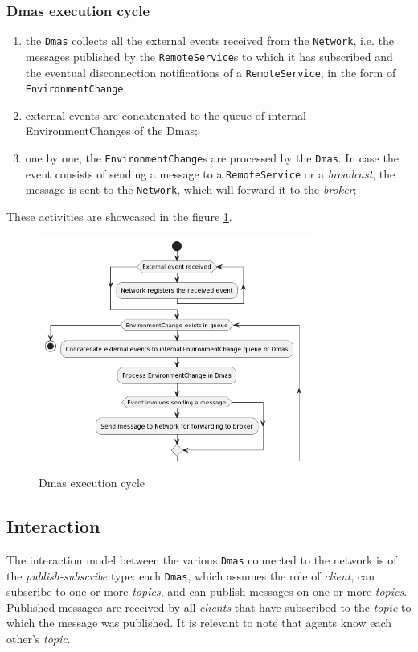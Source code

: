 \subsubsection{Dmas execution cycle}

\begin{enumerate}
    \item the \texttt{Dmas} collects all the external events received from the \texttt{Network},
          i.e. the messages published by the \texttt{RemoteService}s to which it has subscribed and the eventual disconnection notifications of a \texttt{RemoteService},
          in the form of \texttt{EnvironmentChange};
    \item external events are concatenated to the queue of internal EnvironmentChanges of the Dmas;
    \item one by one, the \texttt{EnvironmentChange}s are processed by the \texttt{Dmas}. In case the event consists of sending a message to a \texttt{RemoteService} or a \textit{broadcast}, the message is sent to the \texttt{Network}, which will forward it to the \textit{broker};
\end{enumerate}

These activities are showcased in the figure \ref{fig:execution}.

\begin{figure}[ht]
    \centering
    \includegraphics[width=0.8\textwidth]{figures/activity-applychanges.png}
    \caption{Dmas execution cycle}
    \label{fig:execution}
\end{figure}

\subsection{Interaction}
The interaction model between the various \texttt{Dmas} connected to the network is of the \textit{publish-subscribe} type: each \texttt{Dmas}, which assumes the role of \textit{client}, can subscribe to one or more \textit{topics}, and can publish messages on one or more \textit{topics}.
Published messages are received by all \textit{clients} that have subscribed to the \textit{topic} to which the message was published.
It is relevant to note that agents know each other's \textit{topic}.


